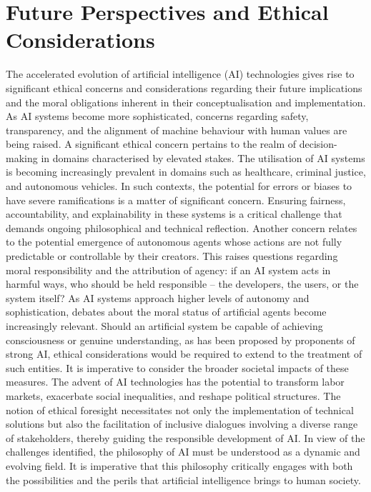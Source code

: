 \documentclass[runningheads]{llncs}
\begin{document}
\section{Future Perspectives and Ethical Considerations}
%
The accelerated evolution of artificial intelligence (AI) technologies gives rise to significant ethical concerns and considerations regarding their future implications and the moral obligations inherent in their conceptualisation and implementation. As AI systems become more sophisticated, concerns regarding safety, transparency, and the alignment of machine behaviour with human values are being raised.
A significant ethical concern pertains to the realm of decision-making in domains characterised by elevated stakes. The utilisation of AI systems is becoming increasingly prevalent in domains such as healthcare, criminal justice, and autonomous vehicles. In such contexts, the potential for errors or biases to have severe ramifications is a matter of significant concern. Ensuring fairness, accountability, and explainability in these systems is a critical challenge that demands ongoing philosophical and technical reflection.
Another concern relates to the potential emergence of autonomous agents whose actions are not fully predictable or controllable by their creators. This raises questions regarding moral responsibility and the attribution of agency: if an AI system acts in harmful ways, who should be held responsible – the developers, the users, or the system itself?
As AI systems approach higher levels of autonomy and sophistication, debates about the moral status of artificial agents become increasingly relevant. Should an artificial system be capable of achieving consciousness or genuine understanding, as has been proposed by proponents of strong AI, ethical considerations would be required to extend to the treatment of such entities.
It is imperative to consider the broader societal impacts of these measures. The advent of AI technologies has the potential to transform labor markets, exacerbate social inequalities, and reshape political structures. The notion of ethical foresight necessitates not only the implementation of technical solutions but also the facilitation of inclusive dialogues involving a diverse range of stakeholders, thereby guiding the responsible development of AI.
In view of the challenges identified, the philosophy of AI must be understood as a dynamic and evolving field. It is imperative that this philosophy critically engages with both the possibilities and the perils that artificial intelligence brings to human society.
%
%
%
%
%
\end{document}

